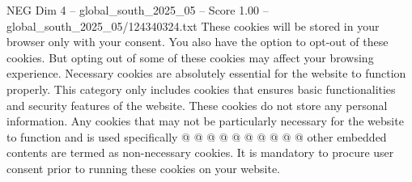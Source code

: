 \begin{textsample}{NEG Dim 4 – global\_south\_2025\_05 – Score 1.00 – global\_south\_2025\_05/124340324.txt}
These cookies will be stored in your browser only with your consent.
You also have the option to opt-out of these cookies.
But opting out of some of these cookies may affect your browsing experience.
Necessary cookies are absolutely essential for the website to function properly.
This category only includes cookies that ensures basic functionalities and security features of the website.
These cookies do not store any personal information.
Any cookies that may not be particularly necessary for the website to function and is used specifically @ @ @ @ @ @ @ @ @ @ other embedded contents are termed as non-necessary cookies.
It is mandatory to procure user consent prior to running these cookies on your website.

\end{textsample}
